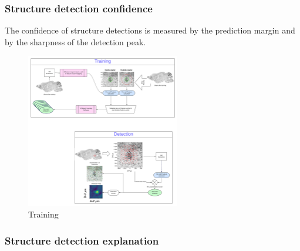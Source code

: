 \documentclass[runningheads]{llncs}
\begin{document}
\subsubsection { Structure detection confidence} The confidence of structure
  detections is measured by the prediction margin and by the sharpness
  of the detection peak.
\begin{figure}
\centering
\includegraphics[width=0.6\textwidth]{figures/Training.pdf}
\caption{Training \label{fig:training}}
\end{figure}



\subsubsection { Structure detection explanation}

\end{document}
